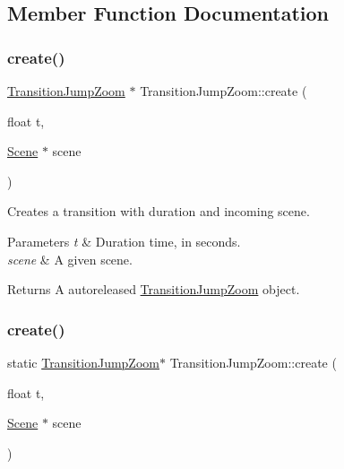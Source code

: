 \subsection{Member Function Documentation}
\mbox{\label{classTransitionJumpZoom_a407f747864b7015310107b8c2433bd73}} 
\subsubsection{\texorpdfstring{create()}{create()}\hspace{0.1cm}{\footnotesize\ttfamily [1/2]}}
{\footnotesize\ttfamily \hyperlink{classTransitionJumpZoom}{Transition\+Jump\+Zoom} $\ast$ Transition\+Jump\+Zoom\+::create (\begin{DoxyParamCaption}\item[{float}]{t,  }\item[{\hyperlink{classScene}{Scene} $\ast$}]{scene }\end{DoxyParamCaption})\hspace{0.3cm}{\ttfamily [static]}}

Creates a transition with duration and incoming scene.


\begin{DoxyParams}{Parameters}
{\em t} & Duration time, in seconds. \\
\hline
{\em scene} & A given scene. \\
\hline
\end{DoxyParams}
\begin{DoxyReturn}{Returns}
A autoreleased \hyperlink{classTransitionJumpZoom}{Transition\+Jump\+Zoom} object. 
\end{DoxyReturn}
\mbox{\label{classTransitionJumpZoom_a9bfe4c4c71834e70c977b866e118dedc}} 
\subsubsection{\texorpdfstring{create()}{create()}\hspace{0.1cm}{\footnotesize\ttfamily [2/2]}}
{\footnotesize\ttfamily static \hyperlink{classTransitionJumpZoom}{Transition\+Jump\+Zoom}$\ast$ Transition\+Jump\+Zoom\+::create (\begin{DoxyParamCaption}\item[{float}]{t,  }\item[{\hyperlink{classScene}{Scene} $\ast$}]{scene }\end{DoxyParamCaption})\hspace{0.3cm}{\ttfamily [static]}}

